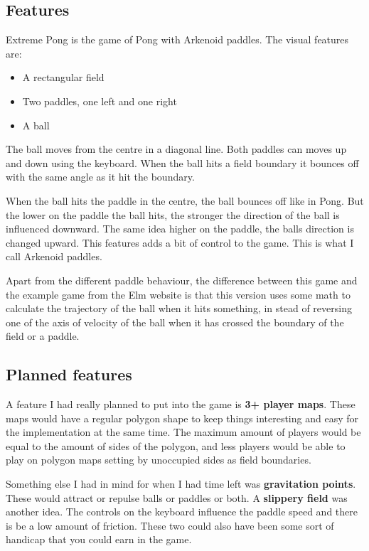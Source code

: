 \documentclass[a4paper]{article}
\begin{document}
\subsection{Features}
Extreme Pong is the game of Pong with Arkenoid paddles. The visual features are:
\begin{itemize}
\item A rectangular field
\item Two paddles, one left and one right
\item A ball
\end{itemize}
The ball moves from the centre in a diagonal line. Both paddles can moves up and
 down using the keyboard. When the ball hits a field boundary it bounces off
 with the same angle as it hit the boundary. 

When the ball hits the paddle in the centre, the ball bounces off like in Pong.
 But the lower on the paddle the ball hits, the stronger the direction of the
 ball is influenced downward. The same idea higher on the paddle, the balls
 direction is changed upward. This features adds a bit of control to the game.
 This is what I call Arkenoid paddles. 

Apart from the different paddle behaviour, the difference between this game and
 the example game from the Elm website is that this version uses some math to
 calculate the trajectory of the ball when it hits something, in stead of
 reversing one of the axis of velocity of the ball when it has crossed the
 boundary of the field or a paddle. 

\subsection{Planned features}
A feature I had really planned to put into the game is \textbf{3+ player maps}.
 These maps would have a regular polygon shape to keep things interesting and
 easy for the implementation at the same time. The maximum amount of players
 would be equal to the amount of sides of the polygon, and less players would
 be able to play on polygon maps setting by unoccupied sides as field
 boundaries. 

Something else I had in mind for when I had time left was \textbf{gravitation
 points}. These would attract or repulse balls or paddles or both. A
 \textbf{slippery field} was another idea. The controls on the keyboard
 influence the paddle speed and there is be a low amount of friction. These
 two could also have been some sort of handicap that you could earn in the game.
\end{document}
